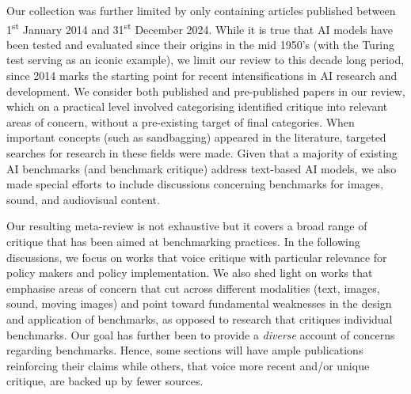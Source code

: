 Our collection was further limited by only containing articles published between 1\textsuperscript{st} January 2014 and 31\textsuperscript{st} December 2024. While it is true that AI models have been tested and evaluated since their origins in the mid 1950's (with the Turing test serving as an iconic example), we limit our review to this decade long period, since 2014 marks the starting point for recent intensifications in AI research and development. We consider both published and pre-published papers in our review, which on a practical level involved categorising identified critique into relevant areas of concern, without a pre-existing target of final categories. When important concepts (such as sandbagging) appeared in the literature, targeted searches for research in these fields were made. Given that a majority of existing AI benchmarks (and benchmark critique) address text-based AI models, we also made special efforts to include discussions concerning benchmarks for images, sound, and audiovisual content. %

Our resulting meta-review is not exhaustive but it covers a broad range of critique that has been aimed at benchmarking practices. In the following discussions, we focus on works that voice critique with particular relevance for policy makers and policy implementation. We also shed light on works that emphasise areas of concern that cut across different modalities (text, images, sound, moving images) and point toward fundamental weaknesses in the design and application of benchmarks, as opposed to research that critiques individual benchmarks. Our goal has further been to provide a \textit{diverse} account of concerns regarding benchmarks. Hence, some sections will have ample publications reinforcing their claims while others, that voice more recent and/or unique critique, are backed up by fewer sources. 


